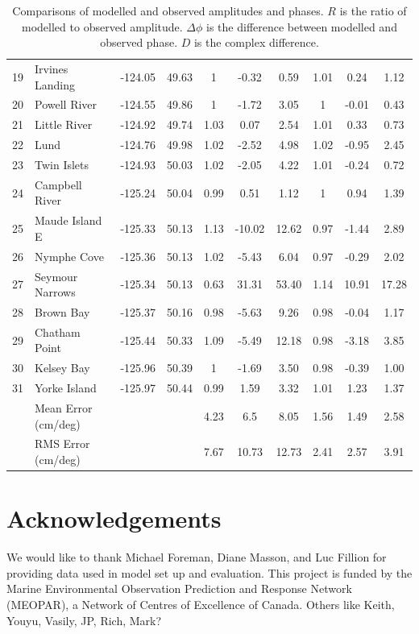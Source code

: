 \documentclass[pdftex,10pt]{article}
\begin{document}
\begin{table}[h]
\begin{tabular}{l l l l c c c c c c}
19 & Irvines Landing & -124.05 & 49.63 & 1 & -0.32 & 0.59  & 1.01 & 0.24 & 1.12 \\
20 & Powell River & -124.55 & 49.86 & 1 & -1.72 & 3.05  & 1 & -0.01 & 0.43 \\
21 & Little River & -124.92 & 49.74 & 1.03 & 0.07 & 2.54  & 1.01 & 0.33 & 0.73\\ 
22 & Lund & -124.76 & 49.98 & 1.02 & -2.52 & 4.98  & 1.02 & -0.95 & 2.45 \\
23 & Twin Islets & -124.93 & 50.03 & 1.02 & -2.05 & 4.22  & 1.01 & -0.24 & 0.72\\ 
24 & Campbell River & -125.24 & 50.04 & 0.99 & 0.51 & 1.12  & 1 & 0.94 & 1.39 \\
25 & Maude Island E & -125.33 & 50.13 & 1.13 & -10.02 & 12.62  & 0.97 & -1.44 & 2.89\\ 
26 & Nymphe Cove & -125.36 & 50.13 & 1.02 & -5.43 & 6.04  & 0.97 & -0.29 & 2.02 \\
27 & Seymour Narrows & -125.34 & 50.13 & 0.63 & 31.31 & 53.40  & 1.14 & 10.91 & 17.28 \\
28 & Brown Bay & -125.37 & 50.16 & 0.98 & -5.63 & 9.26  & 0.98 & -0.04 & 1.17 \\
29 & Chatham Point & -125.44 & 50.33 & 1.09 & -5.49 & 12.18  & 0.98 & -3.18 & 3.85 \\
30 & Kelsey Bay & -125.96 & 50.39 & 1 & -1.69 & 3.50  & 0.98 & -0.39 & 1.00 \\
31 & Yorke Island & -125.97 & 50.44 & 0.99 & 1.59 & 3.32  & 1.01 & 1.23 & 1.37\\ 
\hline 
&   Mean Error (cm/deg) & & & 4.23  & 6.5 & 8.05   & 1.56 & 1.49 & 2.58 \\
&   RMS Error (cm/deg)  & & & 7.67  & 10.73 & 12.73 & 2.41 & 2.57 & 3.91 \\
\hline  
\end{tabular}
\caption{Comparisons of modelled and observed amplitudes and phases. $R$ is the ratio of modelled to observed amplitude. $\Delta \phi$ is the difference between modelled and observed phase. $D$ is the complex difference. }
\label{tab:comparison} 
\end{table}


\section{Acknowledgements}\label{sec:ack}
We would like to thank Michael Foreman, Diane Masson, and Luc Fillion for providing data used in model set up and evaluation. This project is funded by the Marine Environmental Observation Prediction and Response Network (MEOPAR), a Network of Centres of Excellence of Canada.  Others like Keith, Youyu, Vasily, JP, Rich, Mark?




\end{document}
